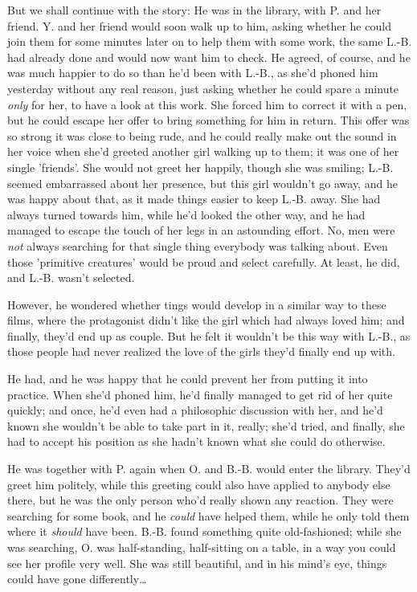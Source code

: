 But we shall continue with the story: He was in the library, with P. and her friend. Y. and her friend would soon walk up to him, asking whether he could join them for some minutes later on to help them with some work, the same L.-B. had already done and would now want him to check. He agreed, of course, and he was much happier to do so than he'd been with L.-B., as she'd phoned him yesterday without any real reason, just asking whether he could spare a minute \emph{only} for her, to have a look at this work. She forced him to correct it with a pen, but he could escape her offer to bring something for him in return. This offer was so strong it was close to being rude, and he could really make out the sound in her voice when she'd greeted another girl walking up to them; it was one of her single 'friends'. She would not greet her happily, though she was smiling; L.-B. seemed embarrassed about her presence, but this girl wouldn't go away, and he was happy about that, as it made things easier to keep L.-B. away. She had always turned towards him, while he'd looked the other way, and he had managed to escape the touch of her legs in an astounding effort. No, men were \emph{not} always searching for that single thing everybody was talking about. Even those 'primitive creatures' would be proud and select carefully. At least, he did, and L.-B. wasn't selected.

However, he wondered whether tings would develop in a similar way to these films, where the protagonist didn't like the girl which had always loved him; and finally, they'd end up as couple. But he felt it wouldn't be this way with L.-B., as those people had never realized the love of the girls they'd finally end up with.

He had, and he was happy that he could prevent her from putting it into practice. When she'd phoned him, he'd finally managed to get rid of her quite quickly; and once, he'd even had a philosophic discussion with her, and he'd known she wouldn't be able to take part in it, really; she'd tried, and finally, she had to accept his position as she hadn't known what she could do otherwise.

He was together with P. again when O. and B.-B. would enter the library. They'd greet him politely, while this greeting could also have applied to anybody else there, but he was the only person who'd really shown any reaction. They were searching for some book, and he \emph{could} have helped them, while he only told them where it \emph{should} have been. B.-B. found something quite old-fashioned; while she was searching, O. was half-standing, half-sitting on a table, in a way you could see her profile very well. She was still beautiful, and in his mind's eye, things could have gone differently\dots{}

